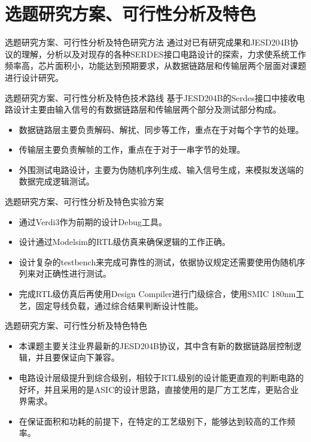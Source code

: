 \documentclass{beamer}
\begin{document}
\section{选题研究方案、可行性分析及特色}

\begin{frame}{选题研究方案、可行性分析及特色}{研究方法}
通过对已有研究成果和JESD204B协议的理解，分析以及对现存的各种SERDES接口电路设计的探索，力求使系统工作频率高，芯片面积小，功能达到预期要求，从数据链路层和传输层两个层面对课题进行设计研究。
\end{frame}

\begin{frame}{选题研究方案、可行性分析及特色}{技术路线}
基于JESD204B的Serdes接口中接收电路设计主要由输入信号的有数据链路层和传输层两个部分及测试部分构成。
	\begin{itemize}
	\item 数据链路层主要负责解码、解扰、同步等工作，重点在于对每个字节的处理。
	\item 传输层主要负责解帧的工作，重点在于对于一串字节的处理。
	\item 外围测试电路设计，主要为伪随机序列生成、输入信号生成，来模拟发送端的数据完成逻辑测试。
	\end{itemize}
\end{frame}

\begin{frame}{选题研究方案、可行性分析及特色}{实验方案}
	\begin{itemize}
	\item 通过Verdi3作为前期的设计Debug工具。
	\item 设计通过Modelsim的RTL级仿真来确保逻辑的工作正确。
	\item 设计复杂的testbench来完成可靠性的测试，依据协议规定还需要使用伪随机序列来对正确性进行测试。
	\item 完成RTL级仿真后再使用Design Compiler进行门级综合，使用SMIC 180nm工艺，固定导线负载，通过综合结果判断设计性能。
	\end{itemize}
\end{frame}

\begin{frame}{选题研究方案、可行性分析及特色}{特色}
	\begin{itemize}
	\item 本课题主要关注业界最新的JESD204B协议，其中含有新的数据链路层控制逻辑，并且要保证向下兼容。
	\item 电路设计层级提升到综合级别，相较于RTL级别的设计能更直观的判断电路的好坏，并且采用的是ASIC的设计思路，直接使用的是厂方工艺库，更贴合业界需求。
	\item 在保证面积和功耗的前提下，在特定的工艺级别下，能够达到较高的工作频率。
	\end{itemize}
\end{frame}
\end{document}

